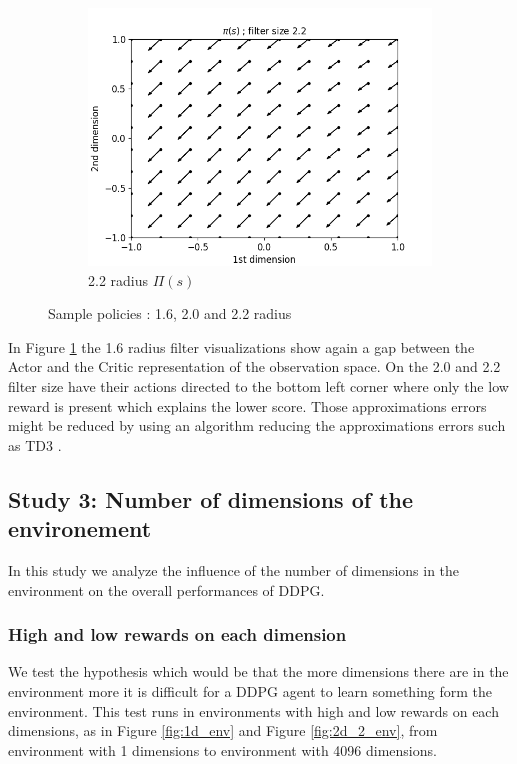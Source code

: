 \documentclass{article}
\begin{document}
\begin{figure}[H]
\begin{subfigure}[b]{0.3\linewidth}
    \includegraphics[width=\linewidth]{Study_2/2.4/visualizations/Pi_arrow_2_2.png}
      \caption{2.2 radius $\Pi(s)$}
  \end{subfigure}
  \caption{Sample policies : 1.6, 2.0 and 2.2 radius}
  \label{fig:sample_policies_corner_sequential}
  \end{figure}
 
 In Figure \ref{fig:sample_policies_corner_sequential} the 1.6 radius filter visualizations show again a gap between the Actor and the Critic representation of the observation space. On the 2.0 and 2.2 filter size have their actions directed to the bottom left corner where only the low reward is present which explains the lower score. Those approximations errors might be reduced by using an algorithm reducing the approximations errors such as TD3 \cite{fujimoto_addressing_2018}.
 
\subsection{Study 3: Number of dimensions of the environement}

In this study we analyze the influence of the number of dimensions in the environment on the overall performances of DDPG.

\subsubsection{High and low rewards on each dimension}

We test the hypothesis which would be that the more dimensions there are in the environment more it is difficult for a DDPG agent to learn something form the environment. This test runs in environments with high and low rewards on each dimensions, as in Figure \ref{fig:1d_env} and Figure \ref{fig:2d_2_env}, from environment with 1 dimensions to environment with 4096 dimensions.
\end{document}
